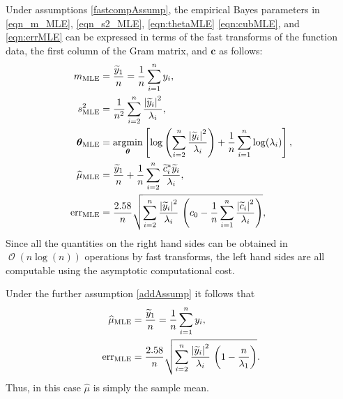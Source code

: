 \documentclass{iitthesis}          %
\DeclareMathOperator{\Order}{{\mathcal O}}
\newcommand{\bm}[1]{\boldsymbol{#1}}
\newcommand{\vtheta}{{\bm{\theta}}}
\newcommand{\vc}{\bm{c}}
\newcommand{\hmu}{\widehat{\mu}}
\newcommand{\MLE}{\textup{MLE}}
\newcommand{\err}{\textup{err}}
\def\abs#1{\ensuremath{\left \lvert #1 \right \rvert}}
\providecommand{\argmin}{\operatorname*{argmin}}
\begin{document}

Under assumptions \eqref{fastcompAssump}, the empirical Bayes parameters in \eqref{eqn_m_MLE}, \eqref{eqn_s2_MLE}, \eqref{eqn:thetaMLE} \eqref{eqn:cubMLE}, and \eqref{eqn:errMLE} can be expressed in terms of the fast transforms of the function data, the first column of the Gram matrix, and $\vc$ as follows:
\begin{align}
\nonumber
m_\MLE &=  \frac{\widetilde{y}_1}{n} = \frac 1n \sum_{i=1}^n y_i,
\\
\nonumber
s^2_\MLE 
& =
\frac{1}{n^2} 
\sum_{i=2}^n \frac{\abs{\widetilde{y}_i}^2}{\lambda_i}, \\
\label{eqn_MLE_loss_func_optimized_2}
\vtheta_\MLE
&= 
\argmin_{\vtheta}
\left[
\log\left(
\sum_{i=2}^n \frac{\abs{\widetilde{y}_i}^2}{\lambda_i}
\right)   + 
\frac{1}{n}\sum_{i=1}^n \log(\lambda_i)
\right],
\\
\nonumber
\hmu_\MLE  &= 
\frac{\widetilde{y}_1}{n} +
\frac 1n \sum_{i=2}^n \frac{ \widetilde{c}_i^* \widetilde{y}_i}{\lambda_i}, \\
\nonumber
\err_\MLE  &
=
\frac{2.58}{n}\sqrt{
	\sum_{i=2}^{n} \frac{\abs{\widetilde{y}_i}^2}{\lambda_i}  
	\,
	\left( c_0 - \frac 1n \sum_{i=1}^n \frac{\abs{\widetilde{c}_i}^2}{\lambda_i} \right) 
},
\end{align}
Since all the quantities on the right hand sides can be obtained in $\Order(n \log(n))$ operations by fast transforms, the left hand sides are all computable using the asymptotic computational cost.

Under the further assumption \eqref{addAssump} it follows that 
\begin{align}
\nonumber
\hmu_\MLE  &= 
\frac{\widetilde{y}_1}{n} = \frac 1n \sum_{i=1}^n y_i,\\
\label{eq:errMLEAllAsump}
\err_\MLE  &
=
\frac{2.58}{n}\sqrt{
	\sum_{i=2}^{n} \frac{\abs{\widetilde{y}_i}^2}{\lambda_i}  
	\,
	\left( 1 -  \frac{n}{\lambda_1} \right) 
}.
\end{align}
Thus, in this  case $\hmu$ is simply the sample mean.
\end{document}
